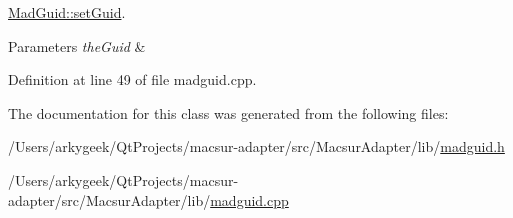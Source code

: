 \hyperlink{class_mad_guid_a899833db4b57903608571b737baa5a0a}{Mad\-Guid\-::set\-Guid}. 


\begin{DoxyParams}{Parameters}
{\em the\-Guid} & \\
\hline
\end{DoxyParams}


Definition at line 49 of file madguid.\-cpp.



The documentation for this class was generated from the following files\-:\begin{DoxyCompactItemize}
\item 
/\-Users/arkygeek/\-Qt\-Projects/macsur-\/adapter/src/\-Macsur\-Adapter/lib/\hyperlink{madguid_8h}{madguid.\-h}\item 
/\-Users/arkygeek/\-Qt\-Projects/macsur-\/adapter/src/\-Macsur\-Adapter/lib/\hyperlink{madguid_8cpp}{madguid.\-cpp}\end{DoxyCompactItemize}
